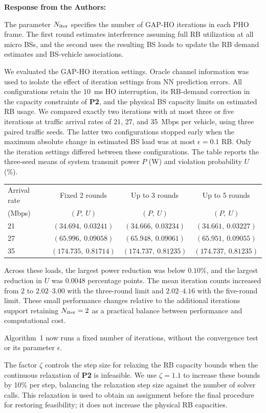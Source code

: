 \documentclass[11pt]{article}
\newenvironment{reviewedit}[1]
{\colorlet{responseblue}{#1}\colorlet{changeblue}{#1}\color{#1}}
{}
\newenvironment{authorresponse}
{\par\noindent\textcolor{responseblue}{\textbf{Response from the Authors:}}\par\color{responseblue}}
{\par}
\begin{document}
\begin{reviewedit}{blue}
\begin{authorresponse}
The parameter $N_{\rm iter}$ specifies the number of GAP-HO iterations in
each PHO frame. The first round estimates interference assuming full RB
utilization at all micro BSs, and the second uses the resulting BS loads
to update the RB demand estimates and BS-vehicle associations.
{\color{blue}
We evaluated the GAP-HO iteration settings. Oracle channel information
was used to isolate the effect of iteration settings from NN prediction errors.
All configurations retain the $10$~ms HO interruption, its RB-demand correction
in the capacity constraints of \textbf{P2}, and the physical BS capacity limits
on estimated RB usage.
We compared exactly two iterations with at most three or five iterations at traffic arrival rates of 21, 27, and 35~Mbps per vehicle, using three paired traffic seeds.
The latter two configurations stopped early when the maximum absolute change
in estimated BS load was at most $\epsilon=0.1$ RB. Only the iteration settings
differed between these configurations. The table reports the three-seed means of
system transmit power $P$ (W) and violation probability $U$ (\%).
\begin{center}
\small
\begin{tabular}{lccc}
\hline
Arrival rate & Fixed 2 rounds & Up to 3 rounds & Up to 5 rounds \\
(Mbps) & $(P,\ U)$ & $(P,\ U)$ & $(P,\ U)$ \\
\hline
21 & $(34.694,\ 0.03241)$ & $(34.666,\ 0.03234)$ & $(34.661,\ 0.03227)$ \\
27 & $(65.996,\ 0.09058)$ & $(65.948,\ 0.09061)$ & $(65.951,\ 0.09055)$ \\
35 & $(174.735,\ 0.81714)$ & $(174.737,\ 0.81235)$ & $(174.737,\ 0.81235)$ \\
\hline
\end{tabular}
\end{center}
Across these loads, the largest power reduction was below $0.10\%$, and the
largest reduction in $U$ was $0.0048$ percentage points. The mean iteration
counts increased from $2$ to $2.02$--$3.00$ with the three-round limit and
$2.02$--$4.16$ with the five-round limit. These small performance changes
relative to the additional iterations support retaining $N_{\rm iter}=2$
as a practical balance between performance and computational cost.\par}
Algorithm~1 now runs a fixed number of iterations, without the convergence
test or its parameter $\epsilon$.

The factor $\zeta$ controls the step size for relaxing the RB capacity bounds
when the continuous relaxation of \textbf{P2} is infeasible. We use $\zeta=1.1$
to increase these bounds by 10\% per step, balancing the relaxation step size against the
number of solver calls. This relaxation is used to obtain an assignment
before the final procedure for restoring feasibility; it does not increase the
physical RB capacities.


\end{authorresponse}
\end{reviewedit}
\end{document}
